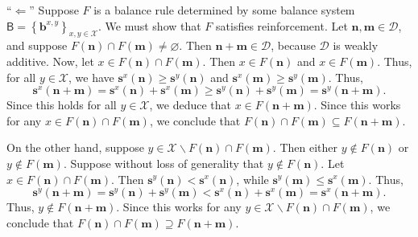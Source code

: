 \documentclass[
]{article}
\begin{document}
``\(\Longleftarrow\)'' Suppose \(F\) is a balance rule determined by
some balance system
\(\mathsf{B} = \left\{ \mathbf{b}^{x,y} \right\}_{x,y \in \mathcal{X}}\).
We must show that \(F\) satisfies reinforcement. Let
\(\mathbf{n},\mathbf{m} \in \mathcal{D}\), and suppose
\(F\left( \mathbf{n} \right) \cap F\left( \mathbf{m} \right) \neq \varnothing\).
Then \(\mathbf{n} + \mathbf{m} \in \mathcal{D}\), because
\(\mathcal{D}\) is weakly additive. Now, let
\(x \in F\left( \mathbf{n} \right) \cap F\left( \mathbf{m} \right)\).
Then \(x \in F\left( \mathbf{n} \right)\) and
\(x \in F\left( \mathbf{m} \right)\). Thus, for all
\(y \in \mathcal{X}\), we have
\(\mathbf{s}^{x}\left( \mathbf{n} \right) \geq \mathbf{s}^{y}\left( \mathbf{n} \right)\)
and
\(\mathbf{s}^{x}\left( \mathbf{m} \right) \geq \mathbf{s}^{y}\left( \mathbf{m} \right)\).
Thus,
\[\mathbf{s}^{x}\left( \mathbf{n} + \mathbf{m} \right) = \mathbf{s}^{x}\left( \mathbf{n} \right) + \mathbf{s}^{x}\left( \mathbf{m} \right) \geq \mathbf{s}^{y}\left( \mathbf{n} \right) + \mathbf{s}^{y}\left( \mathbf{m} \right) = \mathbf{s}^{y}\left( \mathbf{n} + \mathbf{m} \right)\text{.}\]
Since this holds for all \(y \in \mathcal{X}\), we deduce that
\(x \in F\left( \mathbf{n} + \mathbf{m} \right)\). Since this works for
any
\(x \in F\left( \mathbf{n} \right) \cap F\left( \mathbf{m} \right)\), we
conclude that
\(F\left( \mathbf{n} \right) \cap F\left( \mathbf{m} \right) \subseteq F\left( \mathbf{n} + \mathbf{m} \right)\).

On the other hand, suppose
\(y \in \mathcal{X} \smallsetminus F\left( \mathbf{n} \right) \cap F\left( \mathbf{m} \right)\).
Then either \(y \notin F\left( \mathbf{n} \right)\) or
\(y \notin F\left( \mathbf{m} \right)\). Suppose without loss of
generality that \(y \notin F\left( \mathbf{n} \right)\). Let
\(x \in F\left( \mathbf{n} \right) \cap F\left( \mathbf{m} \right)\).
Then
\(\mathbf{s}^{y}\left( \mathbf{n} \right) < \mathbf{s}^{x}\left( \mathbf{n} \right)\),
while
\(\mathbf{s}^{y}\left( \mathbf{m} \right) \leq \mathbf{s}^{x}\left( \mathbf{m} \right)\).
Thus,
\[\mathbf{s}^{y}\left( \mathbf{n} + \mathbf{m} \right) = \mathbf{s}^{y}\left( \mathbf{n} \right) + \mathbf{s}^{y}\left( \mathbf{m} \right) < \mathbf{s}^{x}\left( \mathbf{n} \right) + \mathbf{s}^{x}\left( \mathbf{m} \right) = \mathbf{s}^{x}\left( \mathbf{n} + \mathbf{m} \right)\text{.}\]
Thus, \(y \notin F\left( \mathbf{n} + \mathbf{m} \right)\). Since this
works for any
\(y \in \mathcal{X} \smallsetminus F\left( \mathbf{n} \right) \cap F\left( \mathbf{m} \right)\),
we conclude that
\(F\left( \mathbf{n} \right) \cap F\left( \mathbf{m} \right) \supseteq F\left( \mathbf{n} + \mathbf{m} \right)\).
\end{document}
